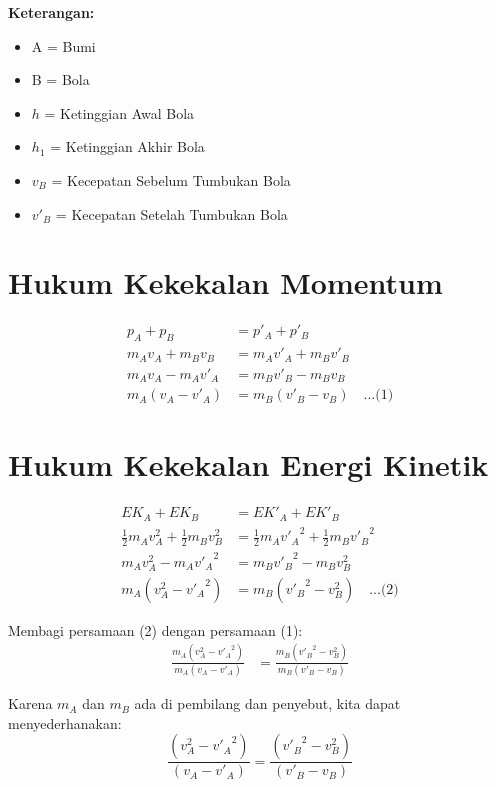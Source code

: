 \textbf{Keterangan:}
\begin{itemize}
    \item A = Bumi
    \item B = Bola
    \item $h$ = Ketinggian Awal Bola
    \item $h_1$ = Ketinggian Akhir Bola
    \item $v_B$ = Kecepatan Sebelum Tumbukan Bola
    \item $v'_B$ = Kecepatan Setelah Tumbukan Bola
\end{itemize}
\section*{Hukum Kekekalan Momentum}
\begin{align}
    p_A + p_B &= p'_A + p'_B \\
    m_A v_A + m_B v_B &= m_A v'_A + m_B v'_B \\
    m_A v_A - m_A v'_A &= m_B v'_B - m_B v_B \\
    m_A (v_A - v'_A) &= m_B (v'_B - v_B) \quad \text{...(1)}
\end{align}

\section*{Hukum Kekekalan Energi Kinetik}
\begin{align}
    EK_A + EK_B &= EK'_A + EK'_B \\
    \frac{1}{2} m_A v_A^2 + \frac{1}{2} m_B v_B^2 &= \frac{1}{2} m_A {v'_A}^2 + \frac{1}{2} m_B {v'_B}^2 \\
    m_A v_A^2 - m_A {v'_A}^2 &= m_B {v'_B}^2 - m_B v_B^2 \\
    m_A (v_A^2 - {v'_A}^2) &= m_B ({v'_B}^2 - v_B^2) \quad \text{...(2)}
\end{align}

Membagi persamaan (2) dengan persamaan (1):
\begin{align}
    \frac{m_A (v_A^2 - {v'_A}^2)}{m_A (v_A - v'_A)} &= \frac{m_B ({v'_B}^2 - v_B^2)}{m_B (v'_B - v_B)}
\end{align}

Karena \( m_A \) dan \( m_B \) ada di pembilang dan penyebut, kita dapat menyederhanakan:
\begin{equation}
    \frac{(v_A^2 - {v'_A}^2)}{(v_A - v'_A)} = \frac{({v'_B}^2 - v_B^2)}{(v'_B - v_B)}
\end{equation}

